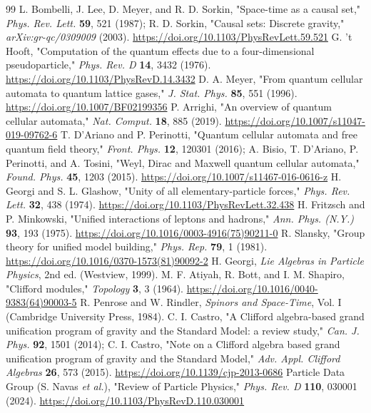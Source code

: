 \documentclass[aps,prd,amsmath,amssymb,superscriptaddress,longbibliography,floatfix,preprint]{revtex4-2}
\begin{document}
\clearpage

\begin{thebibliography}{99}
 L. Bombelli, J. Lee, D. Meyer, and R. D. Sorkin, "Space-time as a causal set," \emph{Phys. Rev. Lett.} \textbf{59}, 521 (1987); R. D. Sorkin, "Causal sets: Discrete gravity," \emph{arXiv:gr-qc/0309009} (2003). \url{https://doi.org/10.1103/PhysRevLett.59.521}
 G. 't Hooft, "Computation of the quantum effects due to a four-dimensional pseudoparticle," \emph{Phys. Rev. D} \textbf{14}, 3432 (1976). \url{https://doi.org/10.1103/PhysRevD.14.3432}
 D. A. Meyer, "From quantum cellular automata to quantum lattice gases," \emph{J. Stat. Phys.} \textbf{85}, 551 (1996). \url{https://doi.org/10.1007/BF02199356}
 P. Arrighi, "An overview of quantum cellular automata," \emph{Nat. Comput.} \textbf{18}, 885 (2019). \url{https://doi.org/10.1007/s11047-019-09762-6}
 T. D'Ariano and P. Perinotti, "Quantum cellular automata and free quantum field theory," \emph{Front. Phys.} \textbf{12}, 120301 (2016); A. Bisio, T. D'Ariano, P. Perinotti, and A. Tosini, "Weyl, Dirac and Maxwell quantum cellular automata," \emph{Found. Phys.} \textbf{45}, 1203 (2015). \url{https://doi.org/10.1007/s11467-016-0616-z}
 H. Georgi and S. L. Glashow, "Unity of all elementary-particle forces," \emph{Phys. Rev. Lett.} \textbf{32}, 438 (1974). \url{https://doi.org/10.1103/PhysRevLett.32.438}
 H. Fritzsch and P. Minkowski, "Unified interactions of leptons and hadrons," \emph{Ann. Phys. (N.Y.)} \textbf{93}, 193 (1975). \url{https://doi.org/10.1016/0003-4916(75)90211-0}
 R. Slansky, "Group theory for unified model building," \emph{Phys. Rep.} \textbf{79}, 1 (1981). \url{https://doi.org/10.1016/0370-1573(81)90092-2}
 H. Georgi, \emph{Lie Algebras in Particle Physics}, 2nd ed. (Westview, 1999).
 M. F. Atiyah, R. Bott, and I. M. Shapiro, "Clifford modules," \emph{Topology} \textbf{3}, 3 (1964). \url{https://doi.org/10.1016/0040-9383(64)90003-5}
 R. Penrose and W. Rindler, \emph{Spinors and Space-Time}, Vol. I (Cambridge University Press, 1984).
 C. I. Castro, "A Clifford algebra-based grand unification program of gravity and the Standard Model: a review study," \emph{Can. J. Phys.} \textbf{92}, 1501 (2014); C. I. Castro, "Note on a Clifford algebra based grand unification program of gravity and the Standard Model," \emph{Adv. Appl. Clifford Algebras} \textbf{26}, 573 (2015). \url{https://doi.org/10.1139/cjp-2013-0686}
 Particle Data Group (S. Navas \emph{et al.}), "Review of Particle Physics," \emph{Phys. Rev. D} \textbf{110}, 030001 (2024). \url{https://doi.org/10.1103/PhysRevD.110.030001}

\end{thebibliography}
\end{document}
